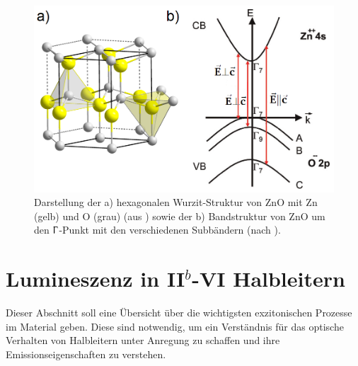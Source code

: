 \begin{figure}[h]
\centering
\includegraphics[width=.5\textwidth]{Bilder/Vorbetrachtung/ZnO_Str_BG}
\caption[ZnO Kristall- und Bandstruktur]{Darstellung der a) hexagonalen Wurzit-Struktur von ZnO mit Zn (gelb) und O (grau) (aus \cite{wurzite}) sowie der b) Bandstruktur von ZnO um den $\Upgamma$-Punkt mit den verschiedenen Subbändern (nach \cite{Klingshirn.2010}).}
\label{ZnO}
\end{figure}
\section{Lumineszenz in II$^b$-VI Halbleitern}
\label{ExAn}
Dieser Abschnitt soll eine Übersicht über die wichtigsten exzitonischen Prozesse im Material geben. Diese sind notwendig, um ein Verständnis für das optische Verhalten von Halbleitern unter Anregung zu schaffen und ihre Emissionseigenschaften zu verstehen.
